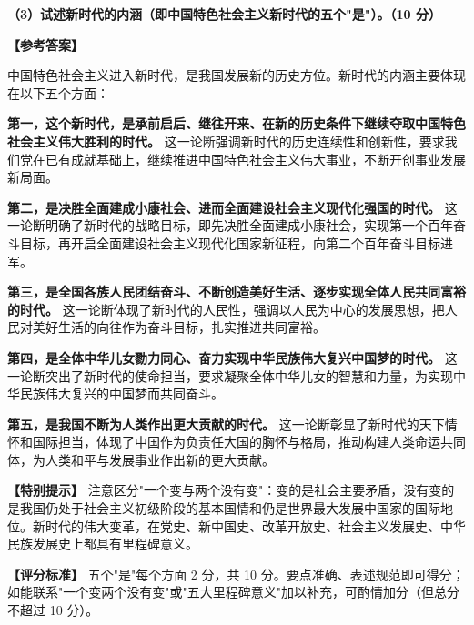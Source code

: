 \documentclass[12pt, a4paper]{article}
\begin{document}
\begin{answerbox}
\textbf{（3）试述新时代的内涵（即中国特色社会主义新时代的五个"是"）。（10 分）}

\textbf{【参考答案】}

中国特色社会主义进入新时代，是我国发展新的历史方位。新时代的内涵主要体现在以下五个方面：

\textbf{第一，这个新时代，是承前启后、继往开来、在新的历史条件下继续夺取中国特色社会主义伟大胜利的时代。} 这一论断强调新时代的历史连续性和创新性，要求我们党在已有成就基础上，继续推进中国特色社会主义伟大事业，不断开创事业发展新局面。

\textbf{第二，是决胜全面建成小康社会、进而全面建设社会主义现代化强国的时代。} 这一论断明确了新时代的战略目标，即先决胜全面建成小康社会，实现第一个百年奋斗目标，再开启全面建设社会主义现代化国家新征程，向第二个百年奋斗目标进军。

\textbf{第三，是全国各族人民团结奋斗、不断创造美好生活、逐步实现全体人民共同富裕的时代。} 这一论断体现了新时代的人民性，强调以人民为中心的发展思想，把人民对美好生活的向往作为奋斗目标，扎实推进共同富裕。

\textbf{第四，是全体中华儿女勠力同心、奋力实现中华民族伟大复兴中国梦的时代。} 这一论断突出了新时代的使命担当，要求凝聚全体中华儿女的智慧和力量，为实现中华民族伟大复兴的中国梦而共同奋斗。

\textbf{第五，是我国不断为人类作出更大贡献的时代。} 这一论断彰显了新时代的天下情怀和国际担当，体现了中国作为负责任大国的胸怀与格局，推动构建人类命运共同体，为人类和平与发展事业作出新的更大贡献。

\textbf{【特别提示】} 注意区分"一个变与两个没有变"：变的是社会主要矛盾，没有变的是我国仍处于社会主义初级阶段的基本国情和仍是世界最大发展中国家的国际地位。新时代的伟大变革，在党史、新中国史、改革开放史、社会主义发展史、中华民族发展史上都具有里程碑意义。

\textbf{【评分标准】} 五个"是"每个方面 2 分，共 10 分。要点准确、表述规范即可得分；如能联系"一个变两个没有变"或"五大里程碑意义"加以补充，可酌情加分（但总分不超过 10 分）。
\end{answerbox}
\end{document}
